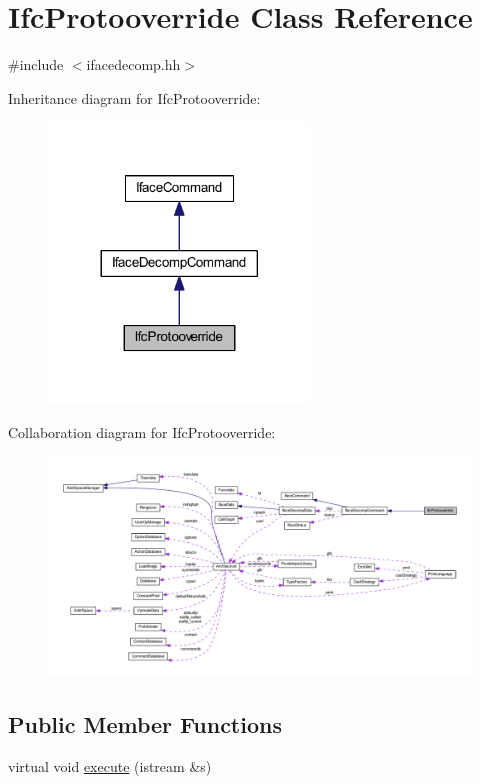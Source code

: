 \hypertarget{class_ifc_protooverride}{}\section{Ifc\+Protooverride Class Reference}
\label{class_ifc_protooverride}


{\ttfamily \#include $<$ifacedecomp.\+hh$>$}



Inheritance diagram for Ifc\+Protooverride\+:
\nopagebreak
\begin{figure}[H]
\begin{center}
\leavevmode
\includegraphics[width=197pt]{class_ifc_protooverride__inherit__graph}
\end{center}
\end{figure}


Collaboration diagram for Ifc\+Protooverride\+:
\nopagebreak
\begin{figure}[H]
\begin{center}
\leavevmode
\includegraphics[width=350pt]{class_ifc_protooverride__coll__graph}
\end{center}
\end{figure}
\subsection*{Public Member Functions}
\begin{DoxyCompactItemize}
\item 
virtual void \mbox{\hyperlink{class_ifc_protooverride_adf9d52b83faac64aae4fb2e27890755c}{execute}} (istream \&s)
\end{DoxyCompactItemize}
